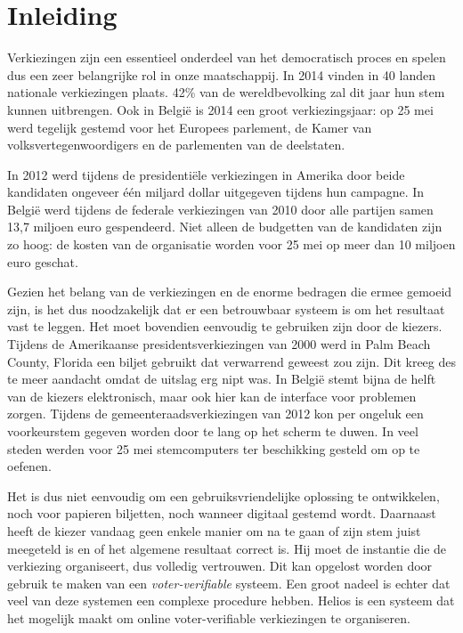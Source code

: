 % 
%

\chapter{Inleiding}
\label{chap:inleiding}

Verkiezingen zijn een essentieel onderdeel van het democratisch proces en spelen dus een zeer belangrijke rol in onze maatschappij. In 2014 vinden in 40 landen nationale verkiezingen plaats. 42\% van de wereldbevolking zal dit jaar hun stem kunnen uitbrengen.\cite{news:economist_2014_ballot_boxes} Ook in Belgi\"e is 2014 een groot verkiezingsjaar: op 25 mei werd tegelijk gestemd voor het Europees parlement, de Kamer van volksvertegenwoordigers en de parlementen van de deelstaten.

\npar In 2012 werd tijdens de presidenti\"ele verkiezingen in Amerika door beide kandidaten ongeveer \'e\'en miljard dollar uitgegeven tijdens hun campagne.\cite{news:nytimes_2012_money_race} In Belgi\"e werd tijdens de federale verkiezingen van 2010 door alle partijen samen 13,7 miljoen euro gespendeerd. Niet alleen de budgetten van de kandidaten zijn zo hoog: de kosten van de organisatie worden voor 25 mei op meer dan 10 miljoen euro geschat.\cite{news:tijd_moeder_aller_verkiezingen_kostprijs}

\npar Gezien het belang van de verkiezingen en de enorme bedragen die ermee gemoeid zijn, is het dus noodzakelijk dat er een betrouwbaar systeem is om het resultaat vast te leggen. Het moet bovendien eenvoudig te gebruiken zijn door de kiezers. Tijdens de Amerikaanse presidentsverkiezingen van 2000 werd in Palm Beach County, Florida een biljet gebruikt dat verwarrend geweest zou zijn. Dit kreeg des te meer aandacht omdat de uitslag erg nipt was.\cite{wiki:united_states_presidential_election_in_florida_2000}\cite{news:nytimes_palm_beach_ballot}\cite{news:nytimes_florida_recount} In Belgi\"e stemt bijna de helft van de kiezers elektronisch, maar ook hier kan de interface voor problemen zorgen. Tijdens de gemeenteraadsverkiezingen van 2012 kon per ongeluk een voorkeurstem gegeven worden door te lang op het scherm te duwen.\cite{news:maddens_zijn_de_stemcomputers_wel_te_vertrouwen} In veel steden werden voor 25 mei stemcomputers ter beschikking gesteld om op te oefenen.\cite{news:de_redactie_ga_eens_oefenen_op_een_stemcomputer}

\npar Het is dus niet eenvoudig om een gebruiksvriendelijke oplossing te ontwikkelen, noch voor papieren biljetten, noch wanneer digitaal gestemd wordt. Daarnaast heeft de kiezer vandaag geen enkele manier om na te gaan of zijn stem juist meegeteld is en of het algemene resultaat correct is. Hij moet de instantie die de verkiezing organiseert, dus volledig vertrouwen. Dit kan opgelost worden door gebruik te maken van een \textit{voter-verifiable} systeem. Een groot nadeel is echter dat veel van deze systemen een complexe procedure hebben. Helios is een systeem dat het mogelijk maakt om online voter-verifiable verkiezingen te organiseren.

